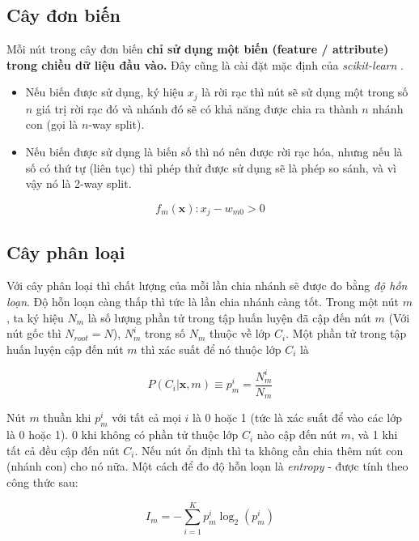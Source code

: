 \subsection{Cây đơn biến}
Mỗi nút trong cây đơn biến \textbf{chỉ sử dụng một biến (feature / attribute) trong chiều dữ liệu đầu vào.} Đây cũng là cài đặt mặc định của \textit{scikit-learn} \cite{aurelien2019handsonml}.
\begin{itemize}
    \item Nếu biến được sử dụng, ký hiệu $x_j$ là rời rạc thì nút sẽ sử dụng một trong số $n$ giá trị rời rạc đó và nhánh đó sẽ có khả năng được chia ra thành $n$ nhánh con (gọi là $n$-way split).
    \item Nếu biến được sử dụng là biến số thì nó nên được rời rạc hóa, nhưng nếu là số có thứ tự (liên tục) thì phép thử được sử dụng sẽ là phép so sánh, và vì vậy nó là 2-way split.
\end{itemize}

\begin{equation} f_m(\mathbf{x}): x_j - w_{m0} > 0 \end{equation}

\subsection{Cây phân loại}
Với cây phân loại thì chất lượng của mỗi lần chia nhánh sẽ được đo bằng \textit{độ hỗn loạn}. Độ hỗn loạn càng thấp thì tức là lần chia nhánh càng tốt.
Trong một nút $m$, ta ký hiệu $N_m$ là số lượng phần tử trong tập huấn luyện đã cập đến nút $m$ (Với nút gốc thì $N_{root} = N$), $N^i_m$ trong số $N_m$ thuộc về lớp $C_i$. Một phần tử trong tập huấn luyện cập đến nút $m$ thì xác suất để nó thuộc lớp $C_i$ là

\begin{equation} \hat{P}(C_i|\mathbf{x}, m) \equiv p^i_m = \frac{N^i_m}{N_m} \end{equation}

Nút $m$ thuần khi $p^i_m$ với tất cả mọi $i$ là 0 hoặc 1 (tức là xác suất để vào các lớp là 0 hoặc 1). 0 khi không có phần tử thuộc lớp $C_i$ nào cập đến nút $m$, và 1 khi tất cả đều cập đến nút $C_i$. Nếu nút ổn định thì ta không cần chia thêm nút con (nhánh con) cho nó nữa. Một cách để đo độ hỗn loạn là \textit{entropy} - được tính theo công thức sau:

\begin{equation} I_m = -\sum_{i = 1}^{K} {p^i_m \log_2(p^i_m)} \end{equation}

